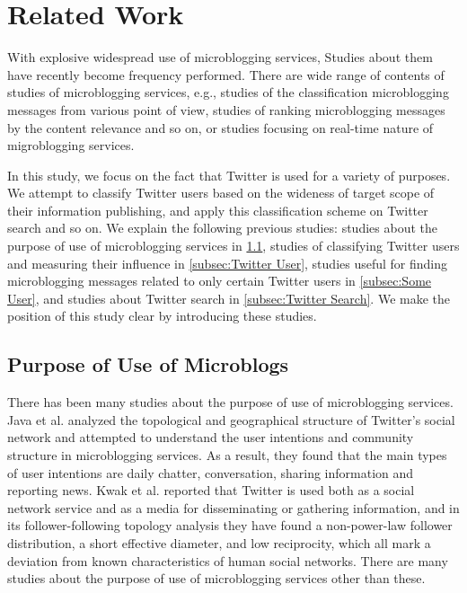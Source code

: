 \section{Related Work}
\label{sec:Related Work}

With explosive widespread use of microblogging services, Studies about
them have recently become frequency performed.  There are wide range of
contents of studies of microblogging services, e.g., studies of the
classification microblogging messages from various point of
view\cite{irani2010study}, studies of ranking microblogging messages by
the content relevance and so on\cite{duan2010empirical}, or studies
focusing on real-time nature of migroblogging
services\cite{takemura2012tweet,mathioudakis2010twittermonitor}.

In this study, we focus on the fact that Twitter is used for a variety
of purposes. We attempt to classify Twitter users based on the
wideness of target scope of their information publishing, and apply this
classification scheme on Twitter search and so on.  We explain the
following previous studies: studies about the purpose of use of
microblogging services in \ref{subsec:Purpose of Use}, studies of
classifying Twitter users and measuring their influence in
\ref{subsec:Twitter User}, studies useful for finding microblogging
messages related to only certain Twitter users in \ref{subsec:Some
User}, and studies about Twitter search in \ref{subsec:Twitter Search}.
We make the position of this study clear by introducing these studies.

\subsection{Purpose of Use of Microblogs}
\label{subsec:Purpose of Use}

There has been many studies about the purpose of use of microblogging
services. Java et al.\cite{java2007we} analyzed the topological and
geographical structure of Twitter's social network and attempted to
understand the user intentions and community structure in microblogging
services.  As a result, they found that the main types of user
intentions are daily chatter, conversation, sharing information and
reporting news.  Kwak et al.\cite{kwak2010twitter} reported that Twitter
is used both as a social network service and as a media for
disseminating or gathering information, and in its follower-following
topology analysis they have found a non-power-law follower distribution,
a short effective diameter, and low reciprocity, which all mark a
deviation from known characteristics of human social networks.  There
are many studies about the purpose of use of microblogging services
other than these\cite{wu2011says,zhao2009and}.

